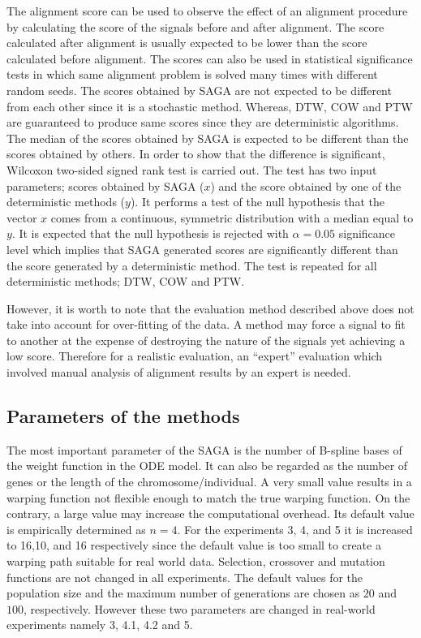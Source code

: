 \documentclass[number,1p,12pt]{elsarticle}
\begin{document}
The alignment score can be used to observe the effect of an alignment procedure by calculating the score of the signals before and after alignment. The score calculated after alignment is usually expected to be lower than the score calculated before alignment.  The scores can also be used in statistical significance tests in which same alignment problem is solved many times with different random seeds. The scores obtained by SAGA are not expected to be different from each other since it is a stochastic method. Whereas, DTW, COW and PTW are guaranteed to produce same scores since they are deterministic algorithms. The median of the scores obtained by SAGA is expected to be different than the scores obtained by others. In order to show that the difference is significant, Wilcoxon two-sided signed rank test is carried out. The test has two input parameters; scores obtained by SAGA ($x$) and the score obtained by one of the deterministic methods ($y$). It performs a test of the null hypothesis that the vector $x$ comes from a continuous, symmetric distribution with a median equal to $y$. It is expected that the null hypothesis is rejected with $\alpha=0.05$ significance level which implies that SAGA generated scores are significantly different than the score generated by a deterministic method. The test is repeated for all deterministic methods; DTW, COW and PTW.

However, it is worth to note that the evaluation method described above does not take into account for over-fitting of the data. A method may force a signal to fit to another at the expense of destroying the nature of the signals yet achieving a low score. Therefore for a realistic evaluation, an ``expert'' evaluation which involved manual analysis of alignment results by an expert is needed.

\subsection{Parameters of the methods}
The most important parameter of the SAGA is the number of B-spline bases of the weight function in the ODE model. It can also be regarded as the number of genes or the length of the chromosome/individual. A very small value results in a warping function not flexible enough to match the true warping function. On the contrary, a large value may increase the computational overhead. Its default value is empirically determined as $n=4$. For the experiments 3, 4, and 5 it is increased to 16,10, and 16 respectively since the default value is too small to create a warping path suitable for real world data. Selection, crossover and mutation functions are not changed in all experiments. The default values for the population size and the maximum number of generations are chosen as $20$ and $100$, respectively. However these two parameters are changed in real-world experiments namely 3, 4.1, 4.2 and 5.  
\end{document}
